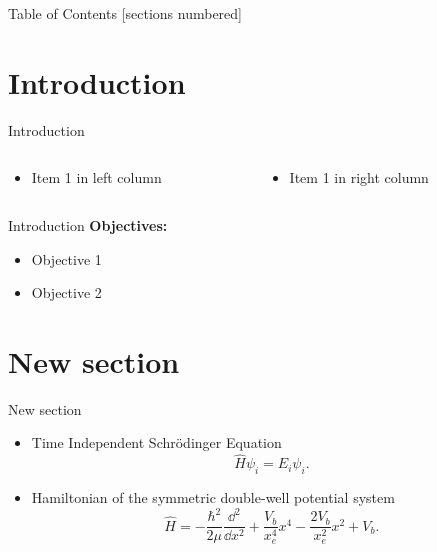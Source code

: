 \begin{frame}{}
\titlepage
\end{frame}

\begin{frame}{Table of Contents}
    [sections numbered]
    \tableofcontents
\end{frame}

\section{Introduction}
\begin{frame}{Introduction}
    \begin{columns}
    \begin{column}{0.4\textwidth}
        \begin{itemize}[label=\textbullet]
            \item Item 1 in left column
        \end{itemize}
    \end{column}
    \begin{column}{0.7\textwidth}
        \begin{itemize}[label=\textbullet]
            \item Item 1 in right column
        \end{itemize}
    \end{column}
    \end{columns}
\end{frame}

\begin{frame}{Introduction}
    \textbf{Objectives:}
    \begin{itemize}[label=\textbullet]
        \item Objective 1
        \item Objective 2
    \end{itemize}
\end{frame}

\renewcommand{\sec}{New section}
\section{\sec}

\begin{frame}{\sec}
    \begin{itemize}[label=\textbullet]
        \item Time Independent Schrödinger Equation
        \begin{equation}
            \hat{H} \psi_i = E_i \psi_i
            .
        \end{equation}
        \item Hamiltonian of the symmetric double-well potential system
        \begin{equation}
            \hat{H} = - \frac{ \hbar^2 }{2 \mu} \frac{ \dd^2 }{ \dd{x^2} } + \frac{V_b}{x_e^4} x^4 - \frac{2V_b}{x_e^2} x^2 + V_b
            .
        \end{equation}
    \end{itemize}
\end{frame}

